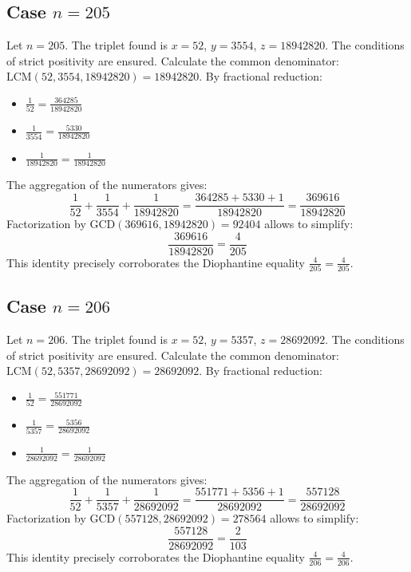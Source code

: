 \documentclass[11pt,a4paper]{article}
\begin{document}
\subsection{Case $n = 205$}
Let $n = 205$. The triplet found is $x = 52$, $y = 3554$, $z = 18942820$.
The conditions of strict positivity are ensured.
Calculate the common denominator: $\text{LCM}(52, 3554, 18942820) = 18942820$.
By fractional reduction:
\begin{itemize}
    \item $\frac{1}{52} = \frac{364285}{18942820}$
    \item $\frac{1}{3554} = \frac{5330}{18942820}$
    \item $\frac{1}{18942820} = \frac{1}{18942820}$
\end{itemize}
The aggregation of the numerators gives:
$$ \frac{1}{52} + \frac{1}{3554} + \frac{1}{18942820} = \frac{364285 + 5330 + 1}{18942820} = \frac{369616}{18942820} $$
Factorization by $\text{GCD}(369616, 18942820) = 92404$ allows to simplify:
$$ \frac{369616}{18942820} = \frac{4}{205} $$
This identity precisely corroborates the Diophantine equality $\frac{4}{205} = \frac{4}{205}$.

\subsection{Case $n = 206$}
Let $n = 206$. The triplet found is $x = 52$, $y = 5357$, $z = 28692092$.
The conditions of strict positivity are ensured.
Calculate the common denominator: $\text{LCM}(52, 5357, 28692092) = 28692092$.
By fractional reduction:
\begin{itemize}
    \item $\frac{1}{52} = \frac{551771}{28692092}$
    \item $\frac{1}{5357} = \frac{5356}{28692092}$
    \item $\frac{1}{28692092} = \frac{1}{28692092}$
\end{itemize}
The aggregation of the numerators gives:
$$ \frac{1}{52} + \frac{1}{5357} + \frac{1}{28692092} = \frac{551771 + 5356 + 1}{28692092} = \frac{557128}{28692092} $$
Factorization by $\text{GCD}(557128, 28692092) = 278564$ allows to simplify:
$$ \frac{557128}{28692092} = \frac{2}{103} $$
This identity precisely corroborates the Diophantine equality $\frac{4}{206} = \frac{4}{206}$.
\end{document}
